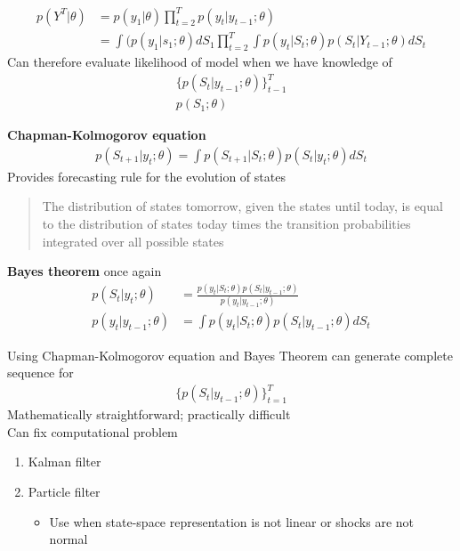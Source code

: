 \documentclass{beamer}
\begin{document}
\begin{frame}
  \begin{align}
   p(Y^T|\theta) &= p(y_1|\theta) \prod^T_{t=2}p(y_t|y_{t-1};\theta)\\
   &= \int(p(y_1|s_1;\theta)dS_1\prod^T_{t=2} \int p(y_t|S_t;\theta) p(S_t|Y_{t-1};\theta)dS_t
  \end{align}
  \medskip
  Can therefore evaluate likelihood of model when we have knowledge of
  \begin{align}
    \{p(S_t|y_{t-1};\theta) \} ^T_{t-1}\\
    p(S_1;\theta)
  \end{align} 
\end{frame}

\begin{frame}
  \textbf{Chapman-Kolmogorov equation}
  \begin{align}
    p(S_{t+1}|y_t;\theta)=\int p(S_{t+1}|S_t;\theta)p(S_t|y_t;\theta)dS_t
  \end{align}
  \medskip
  Provides forecasting rule for the evolution of states
  \begin{quote}
    The distribution of states tomorrow, given the states until today, is equal to the distribution of states today times the transition probabilities integrated over all possible states
  \end{quote}
\end{frame}

\begin{frame}
  \textbf{Bayes theorem} once again
  \begin{align}
    p(S_t|y_t;\theta)&=\frac{p(y_t|S_t;\theta)p(S_t|y_{t-1};\theta)}{p(y_t|y_{t-1};\theta)}\\
    p(y_t|y_{t-1};\theta) &= \int p(y_t|S_t;\theta)p(S_t|y_{t-1};\theta)dS_t
  \end{align}
\end{frame}

\begin{frame}
  Using Chapman-Kolmogorov equation and Bayes Theorem can generate complete sequence for
  \begin{align}
    \{p(S_t|y_{t-1};\theta) \}^T_{t=1}
  \end{align}
  \medskip
  Mathematically straightforward; practically difficult\\
  Can fix computational problem
  \begin{enumerate}
    \item Kalman filter
    \item Particle filter
    \begin{itemize}
      \item Use when state-space representation is not linear or shocks are not normal
    \end{itemize}
  \end{enumerate}
\end{frame}
\end{document}
